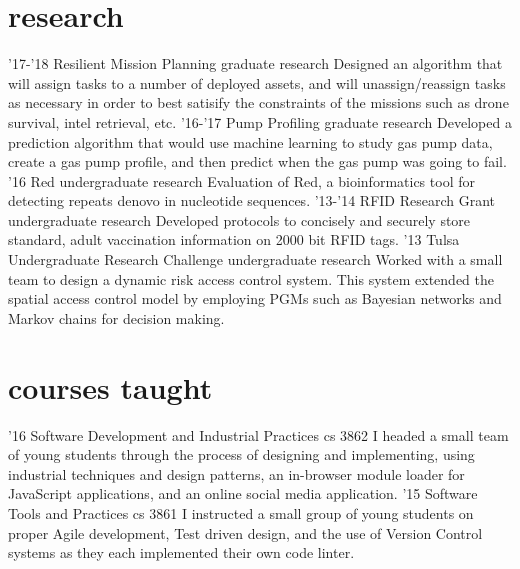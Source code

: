 \documentclass[print]{friggeri-cv}
\begin{document}
  \pagebreak
  \section{research}

    \begin{entrylist}
      \entry
        {'17-'18}
        {Resilient Mission Planning}
        {graduate research}
        {Designed an algorithm that will assign tasks to a number of deployed assets, and will unassign/reassign tasks as necessary in order to best satisify the constraints of the missions such as drone survival, intel retrieval, etc.}
      \entry
        {'16-'17}
        {Pump Profiling}
        {graduate research}
        {Developed a prediction algorithm that would use machine learning to study gas pump data, create a gas pump profile, and then predict when the gas pump was going to fail.}
      \entry
        {'16}
        {Red}
        {undergraduate research}
        {Evaluation of Red, a bioinformatics tool for detecting repeats denovo in nucleotide sequences.}
      \entry
        {'13-'14}
        {RFID Research Grant}
        {undergraduate research}
        {Developed protocols to concisely and securely store standard, adult vaccination information on 2000 bit RFID tags.}
      \entry
        {'13}
        {Tulsa Undergraduate Research Challenge}
        {undergraduate research}
        {Worked with a small team to design a dynamic risk access control system. This system extended the spatial access control model by employing PGMs such as Bayesian networks and Markov chains for decision making.}
    \end{entrylist}

  \section{courses taught}

    \begin{entrylist}
      \entry
        {'16}
        {Software Development and Industrial Practices}
        {cs 3862}
        {I headed a small team of young students through the process of designing and implementing, using industrial techniques and design patterns, an in-browser module loader for JavaScript applications, and an online social media application.}
      \entry
        {'15}
        {Software Tools and Practices}
        {cs 3861}
        {I instructed a small group of young students on proper Agile development, Test driven design, and the use of Version Control systems as they each implemented their own code linter.}
    \end{entrylist}
\end{document}
